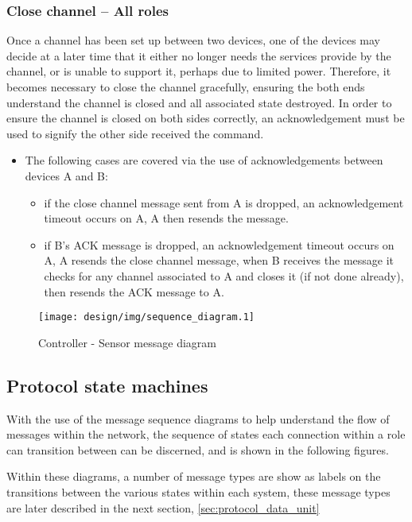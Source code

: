\subsubsection{Close channel -- All roles} %
\label{ssub:close_channel}
Once a channel has been set up between two devices, one of the devices may decide at a later time that it either no longer needs the services provide by the channel, or is unable to support it, perhaps due to limited power. Therefore, it becomes necessary to close the channel gracefully, ensuring the both ends understand the channel is closed and all associated state destroyed. In order to ensure the channel is closed on both sides correctly, an acknowledgement must be used to signify the other side received the command.

\begin{itemize}
	\item The following cases are covered via the use of acknowledgements between devices A and B:
	\begin{itemize}
		\item if the close channel message sent from A is dropped, an acknowledgement timeout occurs on A, A then resends the message.
		\item if B's ACK message is dropped, an acknowledgement timeout occurs on A, A resends the close channel message, when B receives the message it checks for any channel associated to A and closes it (if not done already), then resends the ACK message to A.
	\end{itemize}
\end{itemize}


\begin{figure}[h!]
\centering
\texttt{[image: design/img/sequence\_diagram.1]}
\caption{Controller - Sensor message diagram}
\label{fig:sequence_diagram}
\end{figure}



\newpage
\subsection{Protocol state machines} %
\label{sub:states}
With the use of the message sequence diagrams to help understand the flow of messages within the network, the sequence of states each connection within a role can transition between can be discerned, and is shown in the following figures.

Within these diagrams, a number of message types are show as labels on the transitions between the various states within each system, these message types are later described in the next section, \ref{sec:protocol_data_unit}

